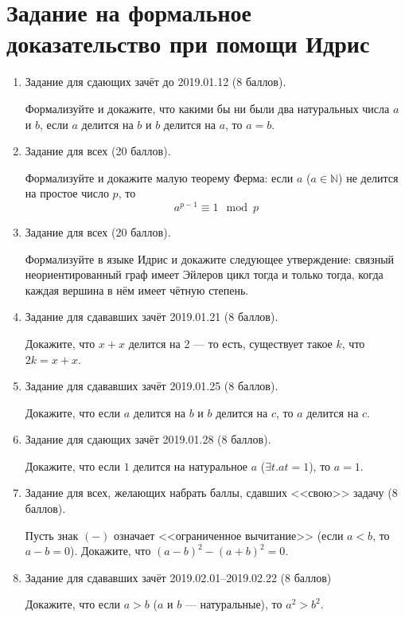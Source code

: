 \documentclass[10pt,a4paper,oneside]{article}
\begin{document}
\section*{Задание на формальное доказательство при помощи Идрис}

\begin{enumerate}
\item Задание для сдающих зачёт до 2019.01.12 (8 баллов).

Формализуйте и докажите, что какими бы ни были два натуральных числа $a$ и $b$, если $a$ делится на $b$ и $b$ делится на $a$,
то $a=b$.

\item Задание для всех (20 баллов).

Формализуйте и докажите малую теорему Ферма: если $a$ ($a \in \mathbb{N}$) не делится на простое число $p$,
то $$a^{p-1} \equiv 1 \mod p$$

\item Задание для всех (20 баллов).

Формализуйте в языке Идрис и докажите следующее утверждение: связный неориентированный
граф имеет Эйлеров цикл тогда и только тогда, когда каждая вершина в нём имеет чётную степень.

\item Задание для сдававших зачёт 2019.01.21 (8 баллов).

Докажите, что $x+x$ делится на 2 --- то есть, существует такое $k$, что $2k=x+x$.

\item Задание для сдававших зачёт 2019.01.25 (8 баллов).

Докажите, что если $a$ делится на $b$ и $b$ делится на $c$, то $a$ делится на $c$.

\item Задание для сдающих зачёт 2019.01.28 (8 баллов).

Докажите, что если $1$ делится на натуральное $a$ ($\exists t. at = 1$), то $a=1$.

\item Задание для всех, желающих набрать баллы, сдавших <<свою>> задачу (8 баллов).

Пусть знак $(-)$ означает <<ограниченное вычитание>> (если $a<b$, то $a-b=0$).
Докажите, что $(a-b)^2 - (a+b)^2 = 0$.

\item Задание для сдававших зачёт 2019.02.01--2019.02.22 (8 баллов)

Докажите, что если $a > b$ ($a$ и $b$ --- натуральные), то $a^2 > b^2$.

\end{enumerate}
\end{document}
